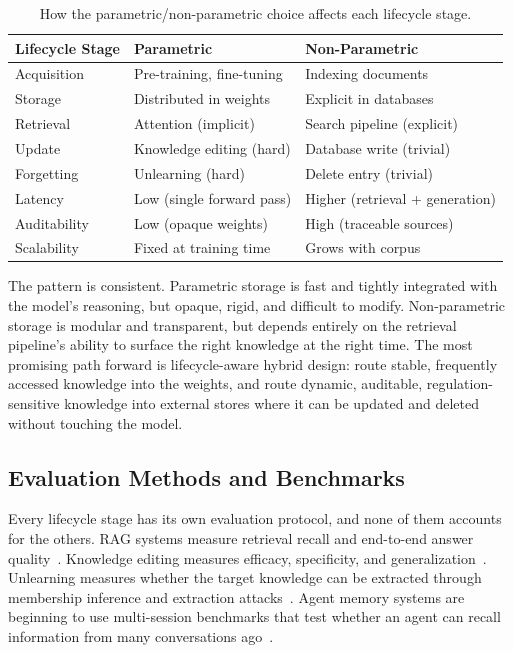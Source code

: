 \documentclass{article}
\begin{document}
\begin{table}[t]
\centering
\caption{How the parametric/non-parametric choice affects each lifecycle stage.}
\label{tab:parametric_comparison}
\small
\begin{tabular}{@{}lll@{}}
\toprule
\textbf{Lifecycle Stage} & \textbf{Parametric} & \textbf{Non-Parametric} \\
\midrule
Acquisition & Pre-training, fine-tuning & Indexing documents \\
Storage & Distributed in weights & Explicit in databases \\
Retrieval & Attention (implicit) & Search pipeline (explicit) \\
Update & Knowledge editing (hard) & Database write (trivial) \\
Forgetting & Unlearning (hard) & Delete entry (trivial) \\
\midrule
Latency & Low (single forward pass) & Higher (retrieval + generation) \\
Auditability & Low (opaque weights) & High (traceable sources) \\
Scalability & Fixed at training time & Grows with corpus \\
\bottomrule
\end{tabular}
\end{table}

The pattern is consistent. Parametric storage is fast and tightly integrated with the model's reasoning, but opaque, rigid, and difficult to modify. Non-parametric storage is modular and transparent, but depends entirely on the retrieval pipeline's ability to surface the right knowledge at the right time. The most promising path forward is lifecycle-aware hybrid design: route stable, frequently accessed knowledge into the weights, and route dynamic, auditable, regulation-sensitive knowledge into external stores where it can be updated and deleted without touching the model.

\subsection{Evaluation Methods and Benchmarks}

Every lifecycle stage has its own evaluation protocol, and none of them accounts for the others. RAG systems measure retrieval recall and end-to-end answer quality~\citep{es2024ragas, chen2024benchmarking}. Knowledge editing measures efficacy, specificity, and generalization~\citep{yao2023editingsurvey}. Unlearning measures whether the target knowledge can be extracted through membership inference and extraction attacks~\citep{maini2024tofu, carlini2021extraction}. Agent memory systems are beginning to use multi-session benchmarks that test whether an agent can recall information from many conversations ago~\citep{hu2025agentmemory}.
\end{document}
